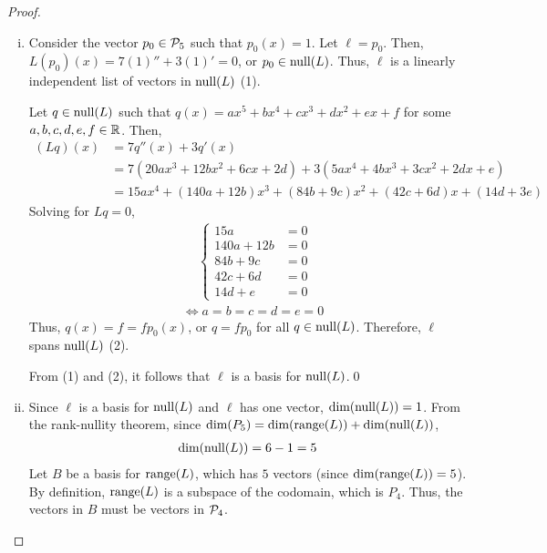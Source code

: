 \begin{proof}
    \renewcommand{\qedsymbol}{$\blacksquare$}
    \begin{enumerate}[(i)]
        \item Consider the vector $p_0\in\P_5$ such that $p_0(x)=1$. Let $\ell=p_0$.
              Then, $L(p_0)(x)=7(1)''+3(1)'=0$, or $p_0\in\nullla(L)$.
              Thus, $\ell$ is a linearly independent list of vectors in $\nullla(L)$ (1).

              Let $q\in\nullla(L)$ such that $q(x)=ax^5+bx^4+cx^3+dx^2+ex+f$ for some $a,b,c,d,e,f\in\R$.
              Then,
              \[
                  \begin{aligned}
                      (Lq)(x)
                       & = 7q''(x)+3q'(x)                                      \\
                       & = 7(20ax^3+12bx^2+6cx+2d)+3(5ax^4+4bx^3+3cx^2+2dx+e)  \\
                       & = 15ax^4+(140a+12b)x^3+(84b+9c)x^2+(42c+6d)x+(14d+3e)
                  \end{aligned}
              \]
              Solving for $Lq=0$,
              \begin{align*}
                   & \quad \ \begin{cases}
                                 15a      & = 0 \\
                                 140a+12b & = 0 \\
                                 84b+9c   & = 0 \\
                                 42c+6d   & = 0 \\
                                 14d+e    & = 0
                             \end{cases} \\
                   & \iff a=b=c=d=e=0
              \end{align*}
              Thus, $q(x)=f=fp_0(x)$, or $q=fp_0$ for all $q\in\nullla(L)$. Therefore, $\ell$ spans $\nullla(L)$ (2).

              From (1) and (2), it follows that $\ell$ is a basis for $\nullla(L)$.\qed
        \item Since $\ell$ is a basis for $\nullla(L)$ and $\ell$ has one vector, $\dim(\nullla(L))=1$.
              From the rank-nullity theorem, since $\dim(P_5)=\dim(\range(L))+\dim(\nullla(L))$, \begin{equation*}
                  \begin{aligned}
                      \dim(\nullla(L))=6-1=5
                  \end{aligned}
              \end{equation*}
              Let $B$ be a basis for $\range(L)$, which has $5$ vectors (since $\dim(\range(L))=5$).
              By definition, $\range(L)$ is a subspace of the codomain, which is $P_4$.
              Thus, the vectors in $B$ must be vectors in $\P_4$.


\end{enumerate}
\end{proof}
